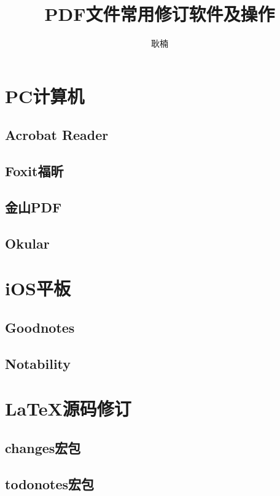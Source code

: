 \documentclass[fontset = none, t, aspectratio=169]{ctexbeamer}
\title[pdfReview]{\Large PDF文件常用修订软件及操作}
\author[N. Geng]{耿楠}
\date{\tosemester} %
\institute[教发中心]{教学发展中心\\西北农林科技大学}
\begin{document}
\begin{frame}
  \maketitle
\end{frame}

\tableofcontents


\section{PC计算机}
\subsection{Acrobat Reader}
\subsection{Foxit福昕}
\subsection{金山PDF}
\subsection{Okular}

\section{iOS平板}
\subsection{Goodnotes}
\subsection{Notability}

\section{\LaTeX 源码修订}
\subsection{changes宏包}
\subsection{todonotes宏包}
\end{document}
